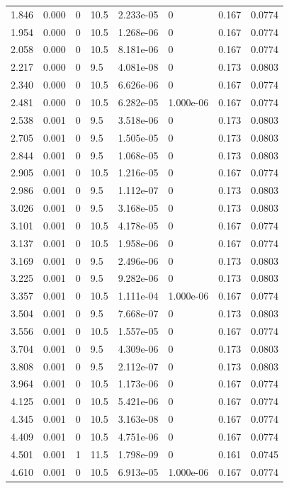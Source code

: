 \documentclass[preview]{standalone}
\begin{document}
{{\begin{tabular}{L{1.2cm}C{1.2cm} C{0.3cm}C{0.5cm} C{1.4cm}C{1.4cm} C{1.4cm}C{1.4cm}}
  1.846  &  0.000  & 0     & 10.5 &  2.233e-05  & 0  & 0.167 &  0.0774   \\ 
  1.954  &  0.000  & 0     & 10.5 &  1.268e-06  & 0  & 0.167 &  0.0774   \\ 
  2.058  &  0.000  & 0     & 10.5 &  8.181e-06  & 0  & 0.167 &  0.0774   \\ 
  2.217  &  0.000  & 0     & 9.5 &  4.081e-08  & 0  & 0.173 &  0.0803   \\ 
  2.340  &  0.000  & 0     & 10.5 &  6.626e-06  & 0  & 0.167 &  0.0774   \\ 
  2.481  &  0.000  & 0     & 10.5 &  6.282e-05  & 1.000e-06  & 0.167 &  0.0774   \\ 
  2.538  &  0.001  & 0     & 9.5 &  3.518e-06  & 0  & 0.173 &  0.0803   \\ 
  2.705  &  0.001  & 0     & 9.5 &  1.505e-05  & 0  & 0.173 &  0.0803   \\ 
  2.844  &  0.001  & 0     & 9.5 &  1.068e-05  & 0  & 0.173 &  0.0803   \\ 
  2.905  &  0.001  & 0     & 10.5 &  1.216e-05  & 0  & 0.167 &  0.0774   \\ 
  2.986  &  0.001  & 0     & 9.5 &  1.112e-07  & 0  & 0.173 &  0.0803   \\ 
  3.026  &  0.001  & 0     & 9.5 &  3.168e-05  & 0  & 0.173 &  0.0803   \\ 
  3.101  &  0.001  & 0     & 10.5 &  4.178e-05  & 0  & 0.167 &  0.0774   \\ 
  3.137  &  0.001  & 0     & 10.5 &  1.958e-06  & 0  & 0.167 &  0.0774   \\ 
  3.169  &  0.001  & 0     & 9.5 &  2.496e-06  & 0  & 0.173 &  0.0803   \\ 
  3.225  &  0.001  & 0     & 9.5 &  9.282e-06  & 0  & 0.173 &  0.0803   \\ 
  3.357  &  0.001  & 0     & 10.5 &  1.111e-04  & 1.000e-06  & 0.167 &  0.0774   \\ 
  3.504  &  0.001  & 0     & 9.5 &  7.668e-07  & 0  & 0.173 &  0.0803   \\ 
  3.556  &  0.001  & 0     & 10.5 &  1.557e-05  & 0  & 0.167 &  0.0774   \\ 
  3.704  &  0.001  & 0     & 9.5 &  4.309e-06  & 0  & 0.173 &  0.0803   \\ 
  3.808  &  0.001  & 0     & 9.5 &  2.112e-07  & 0  & 0.173 &  0.0803   \\ 
  3.964  &  0.001  & 0     & 10.5 &  1.173e-06  & 0  & 0.167 &  0.0774   \\ 
  4.125  &  0.001  & 0     & 10.5 &  5.421e-06  & 0  & 0.167 &  0.0774   \\ 
  4.345  &  0.001  & 0     & 10.5 &  3.163e-08  & 0  & 0.167 &  0.0774   \\ 
  4.409  &  0.001  & 0     & 10.5 &  4.751e-06  & 0  & 0.167 &  0.0774   \\ 
  4.501  &  0.001  & 1     & 11.5 &  1.798e-09  & 0  & 0.161 &  0.0745   \\ 
  4.610  &  0.001  & 0     & 10.5 &  6.913e-05  & 1.000e-06  & 0.167 &  0.0774   \\ 
\hline 
\end{tabular} 

}}
\end{document}

